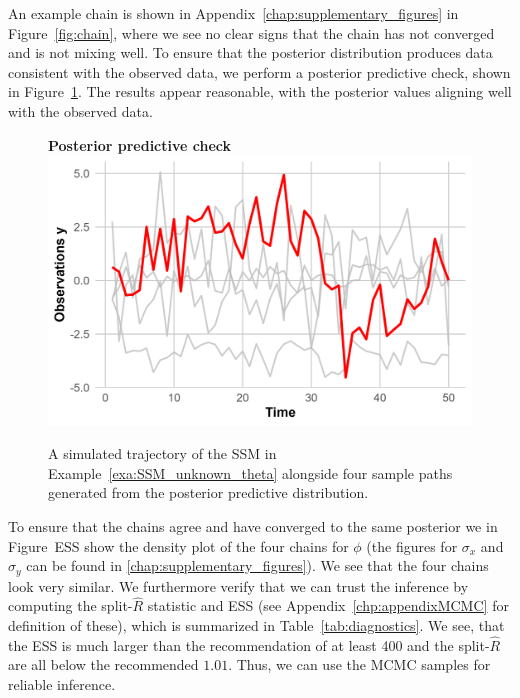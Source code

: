 \begin{example}
	An example chain is shown in Appendix~\ref{chap:supplementary_figures} in Figure~\ref{fig:chain}, where we see no clear signs that the chain has not converged and is not mixing well. To ensure that the posterior distribution produces data consistent with the observed data, we perform a posterior predictive check, shown in Figure~\ref{fig:Posterior_predictive_check}. The results appear reasonable, with the posterior values aligning well with the observed data.
	
	\begin{figure}
		\centering
		\textbf{Posterior predictive check}
		\includegraphics[width=\textwidth]{prior_predictive_check.png}
		\caption{A simulated trajectory of the SSM in Example~\ref{exa:SSM_unknown_theta} alongside four sample paths generated from the posterior predictive distribution.}
		\label{fig:Posterior_predictive_check}
	\end{figure} 
	
	To ensure that the chains agree and have converged to the same posterior we in Figure~\gls*{ESS} show the density plot of the four chains for $\phi$ (the figures for $\sigma_x$ and $\sigma_y$ can be found in \ref{chap:supplementary_figures}). We see that the four chains look very similar. We furthermore verify that we can trust the inference by computing the split-$\widehat{R}$ statistic and \gls*{ESS} (see Appendix~\ref{chp:appendixMCMC} for definition of these), which is summarized in Table~\ref{tab:diagnostics}. We see, that the ESS is much larger than the recommendation of at least 400 and the split-\(\widehat{R}\) are all below the recommended $1.01$. Thus, we can use the MCMC samples for reliable inference.
	

\end{example}
